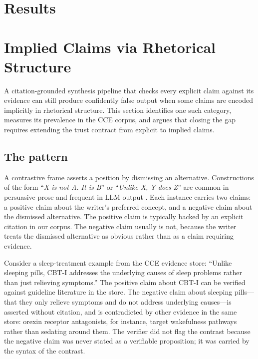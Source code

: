 \documentclass[11pt]{article}
\begin{document}
\section{Results}
\label{sec:results}

\section{Implied Claims via Rhetorical Structure}
\label{sec:implied}

A citation-grounded synthesis pipeline that checks every explicit claim
against its evidence can still produce confidently false output when some
claims are encoded implicitly in rhetorical structure. This section
identifies one such category, measures its prevalence in the CCE corpus, and
argues that closing the gap requires extending the trust contract from
explicit to implied claims.

\subsection{The pattern}
\label{sec:implied-pattern}

A contrastive frame asserts a position by dismissing an alternative.
Constructions of the form ``\textit{X is not A. It is B}'' or ``\textit{Unlike
X, Y does Z}'' are common in persuasive prose and frequent in
LLM output \citep{qiu_rhetorical_2025}. Each instance carries two claims: a
positive claim about the writer's preferred concept, and a negative claim
about the dismissed alternative. The positive claim is typically backed by an
explicit citation in our corpus. The negative claim usually is not, because
the writer treats the dismissed alternative as obvious rather than as a claim
requiring evidence.

Consider a sleep-treatment example from the CCE evidence store: ``Unlike
sleeping pills, CBT-I addresses the underlying causes of sleep problems
rather than just relieving symptoms.'' The positive claim about CBT-I can be
verified against guideline literature in the store. The negative claim
about sleeping pills---that they only relieve symptoms and do not address
underlying causes---is asserted without citation, and is contradicted by other
evidence in the same store: orexin receptor antagonists, for instance, target
wakefulness pathways rather than sedating around them. The verifier did
not flag the contrast because the negative claim was never stated as a
verifiable proposition; it was carried by the syntax of the contrast.
\end{document}
